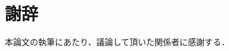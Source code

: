 \documentclass[a4j,11pt,oneside,openany,report]{jsbook}
\begin{document}

\backmatter
\chapter{謝辞}
本論文の執筆にあたり、議論して頂いた関係者に感謝する．




\begin{thebibliography}{99}
  
\end{thebibliography}
\end{document}
